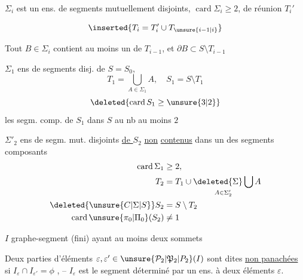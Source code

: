 $\Sigma_i$ est un ens. de segments  mutuellement disjoints, $\operatorname{card}\Sigma_i\geq 2$,  de réunion $T_i'$ 

\reversemarginpar{}
\[\inserted{T_i=T_i'\cup T_{\unsure{i-1|i}}}\]
\noindent\llap{\rule[-2\baselineskip]{.4pt}{3\baselineskip}\hspace{.4em}}

Tout $B\in\Sigma_i$ contient au moins un   de $T_{i-1}$, et $\partial B\subset S\setminus T_{i-1}$ \normalmarginpar

\noindent\begin{minipage}[t]{.46\linewidth}
$\Sigma_1$ ens de segments  disj. de $S=S_0$,  
\[T_1=\bigcup_{A\in\Sigma_1} A,\quad S_1=S\setminus T_1\]
\[\deleted{\operatorname{card}S_1\geq\unsure{3|2}}\]
les segm. comp. de $S_1$ dans $S$ au nb au moins $2$
\end{minipage}\hfill\begin{minipage}[t]{.51\linewidth}
$\Sigma'_2$ ens de segm. mut. disjoints \uline{de $S_2$} \uline{non} \uline{contenus} dans un des segments composants
\[\begin{aligned}\operatorname{card}\Sigma_1&\geq 2,\\
T_2&=T_1\cup\mathop{\deleted{\Sigma}\bigcup}\limits_{A\in\Sigma'_2} A\\
\deleted{\unsure{C|\Sigma|S}}S_2&=S\setminus T_2\\
\operatorname{card}\unsure{\pi_0|\Pi_0}(S_2)&\ne 1
\end{aligned}\]
\end{minipage}

$I$ graphe-segment (fini) ayant au moins deux sommets

Deux parties d'éléments $\varepsilon,\varepsilon'\in\unsure{\mathcal{P}_2|\mathfrak{P}_2|P_2}(I)$ sont dites \uline{non panachées} si  $I_{\varepsilon}\cap I_{\varepsilon'}=\phi$ , -- $I_{\varepsilon}$ est le segment déterminé par un ens. à deux éléments $\varepsilon$.

